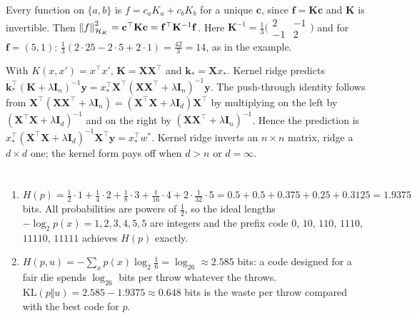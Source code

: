 Every function on $\{a,b\}$ is $f = c_aK_a + c_bK_b$ for a unique $\mathbf c$, since $\mathbf f = \mathbf K\mathbf c$ and $\mathbf K$ is invertible. Then $\left\|f\right\|_{\mathcal H_K}^2 = \mathbf c^\top\mathbf K\mathbf c = \mathbf f^\top\mathbf K^{-1}\mathbf f$. Here $\mathbf K^{-1} = \frac13\bigl(\begin{smallmatrix}2&-1\\-1&2\end{smallmatrix}\bigr)$ and for $\mathbf f = (5,1)$: $\frac13(2\cdot25 - 2\cdot5 + 2\cdot1) = \frac{42}{3} = 14$, as in the example.

With $K(x,x') = x^\top x'$, $\mathbf K = \mathbf X\mathbf X^\top$ and $\mathbf k_* = \mathbf Xx_*$. Kernel ridge predicts $\mathbf k_*^\top(\mathbf K + \lambda\mathbf I_n)^{-1}\mathbf y = x_*^\top\mathbf X^\top(\mathbf X\mathbf X^\top + \lambda\mathbf I_n)^{-1}\mathbf y$. The push-through identity follows from $\mathbf X^\top(\mathbf X\mathbf X^\top + \lambda\mathbf I_n) = (\mathbf X^\top\mathbf X + \lambda\mathbf I_d)\mathbf X^\top$ by multiplying on the left by $(\mathbf X^\top\mathbf X + \lambda\mathbf I_d)^{-1}$ and on the right by $(\mathbf X\mathbf X^\top + \lambda\mathbf I_n)^{-1}$. Hence the prediction is $x_*^\top(\mathbf X^\top\mathbf X + \lambda\mathbf I_d)^{-1}\mathbf X^\top\mathbf y = x_*^\top w^*$. Kernel ridge inverts an $n\times n$ matrix, ridge a $d\times d$ one; the kernel form pays off when $d > n$ or $d = \infty$.

\section{}

\begin{enumerate}[nosep]
  \item $H(p) = \frac12\cdot1 + \frac14\cdot2 + \frac18\cdot3 + \frac1{16}\cdot4 + 2\cdot\frac1{32}\cdot5 = 0.5 + 0.5 + 0.375 + 0.25 + 0.3125 = 1.9375$ bits.
        All probabilities are powers of $\frac12$, so the ideal lengths $-\log_2p(x) = 1, 2, 3, 4, 5, 5$ are
        integers and the prefix code $0$, $10$, $110$, $1110$, $11110$, $11111$ achieves $H(p)$ exactly.
  \item $H(p, u) = -\sum_xp(x)\log_2\frac16 = \log_26\approx2.585$ bits: a code designed for a fair die
        spends $\log_26$ bits per throw whatever the throws. $\mathrm{KL}(p\Vert u) = 2.585 - 1.9375\approx0.648$ bits is
        the waste per throw compared with the best code for $p$.
\end{enumerate}

